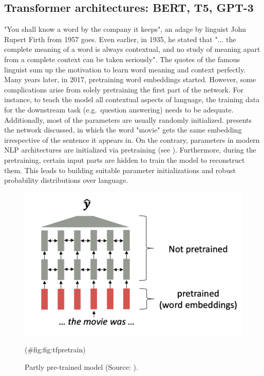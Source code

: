 \documentclass[
]{krantz}
\begin{document}
\hypertarget{transformer-architectures-bert-t5-gpt-3}{%
\subsection{Transformer architectures: BERT, T5, GPT-3}\label{transformer-architectures-bert-t5-gpt-3}}

"You shall know a word by the company it keeps", an adage by linguist
John Rupert Firth from 1957 goes. Even earlier, in 1935, he stated that
"... the complete meaning of a word is always contextual, and no study
of meaning apart from a complete context can be taken seriously". The
quotes of the famous linguist sum up the motivation to learn word
meaning and context perfectly. Many years later, in 2017, pretraining
word embeddings started. However, some complications arise from solely
pretraining the first part of the network. For instance, to teach the
model all contextual aspects of language, the training data for the
downstream task (e.g.~question answering) needs to be adequate.
Additionally, most of the parameters are usually randomly initialized.
presents the network discussed, in which the word "movie" gets the
same embedding irrespective of the sentence it appears in. On the
contrary, parameters in modern NLP architectures are initialized via
pretraining (see ). Furthermore, during the pretraining, certain input
parts are hidden to train the model to reconstruct them. This leads to
building suitable parameter initializations and robust probability
distributions over language.\\

\begin{figure}

{\centering \includegraphics[width=0.8\linewidth]{./figures/01-01-nlp/transformer_pretrain_stanford} 

}

\caption{Partly pre-trained model (Source: \citet{Manning2022}).}(\#fig:fig:tfpretrain)
\end{figure}
\end{document}
